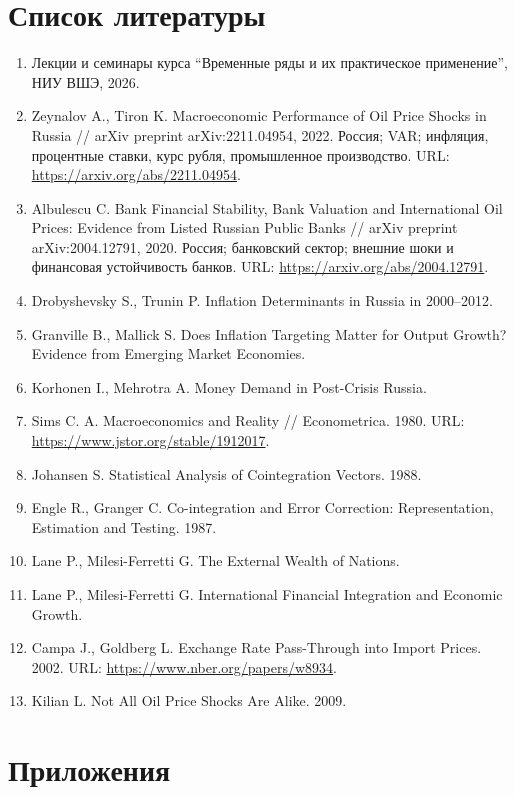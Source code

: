 \documentclass[12pt,a4paper]{article}
\begin{document}
\section*{Список литературы}
\begin{enumerate}
\item Лекции и семинары курса ``Временные ряды и их практическое применение'', НИУ ВШЭ, 2026.
\item Zeynalov A., Tiron K. Macroeconomic Performance of Oil Price Shocks in Russia // arXiv preprint arXiv:2211.04954, 2022. Россия; VAR; инфляция, процентные ставки, курс рубля, промышленное производство. URL: \url{https://arxiv.org/abs/2211.04954}.
\item Albulescu C. Bank Financial Stability, Bank Valuation and International Oil Prices: Evidence from Listed Russian Public Banks // arXiv preprint arXiv:2004.12791, 2020. Россия; банковский сектор; внешние шоки и финансовая устойчивость банков. URL: \url{https://arxiv.org/abs/2004.12791}.
\item Drobyshevsky S., Trunin P. Inflation Determinants in Russia in 2000--2012.
\item Granville B., Mallick S. Does Inflation Targeting Matter for Output Growth? Evidence from Emerging Market Economies.
\item Korhonen I., Mehrotra A. Money Demand in Post-Crisis Russia.
\item Sims C. A. Macroeconomics and Reality // Econometrica. 1980. URL: \url{https://www.jstor.org/stable/1912017}.
\item Johansen S. Statistical Analysis of Cointegration Vectors. 1988.
\item Engle R., Granger C. Co-integration and Error Correction: Representation, Estimation and Testing. 1987.
\item Lane P., Milesi-Ferretti G. The External Wealth of Nations.
\item Lane P., Milesi-Ferretti G. International Financial Integration and Economic Growth.
\item Campa J., Goldberg L. Exchange Rate Pass-Through into Import Prices. 2002. URL: \url{https://www.nber.org/papers/w8934}.
\item Kilian L. Not All Oil Price Shocks Are Alike. 2009.
\end{enumerate}

\section*{Приложения}
\end{document}
